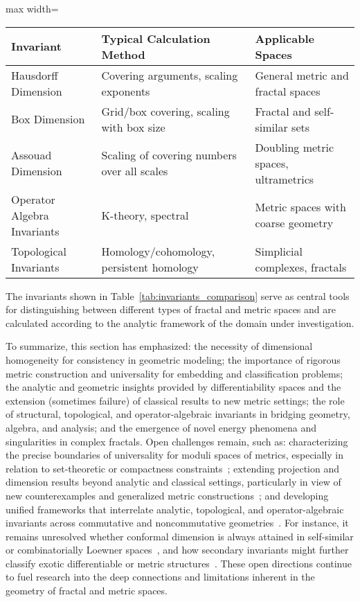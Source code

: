 \documentclass[sigconf]{acmart}
\begin{document}
\begin{table*}[htbp]
\centering
\caption{Key Invariants Across Metric Spaces and Their Calculation Methods}
\label{tab:invariants_comparison}
\begin{adjustbox}{max width=\textwidth}
\begin{tabular}{lll}
\toprule
\textbf{Invariant} & \textbf{Typical Calculation Method} & \textbf{Applicable Spaces} \\
\midrule
Hausdorff Dimension & Covering arguments, scaling exponents & General metric and fractal spaces \\
Box Dimension & Grid/box covering, scaling with box size & Fractal and self-similar sets \\
Assouad Dimension & Scaling of covering numbers over all scales & Doubling metric spaces, ultrametrics \\
Operator Algebra Invariants & K-theory, spectral & Metric spaces with coarse geometry \\
Topological Invariants & Homology/cohomology, persistent homology & Simplicial complexes, fractals \\
\bottomrule
\end{tabular}
\end{adjustbox}
\end{table*}

The invariants shown in Table~\ref{tab:invariants_comparison} serve as central tools for distinguishing between different types of fractal and metric spaces and are calculated according to the analytic framework of the domain under investigation.

To summarize, this section has emphasized: the necessity of dimensional homogeneity for consistency in geometric modeling; the importance of rigorous metric construction and universality for embedding and classification problems; the analytic and geometric insights provided by differentiability spaces and the extension (sometimes failure) of classical results to new metric settings; the role of structural, topological, and operator-algebraic invariants in bridging geometry, algebra, and analysis; and the emergence of novel energy phenomena and singularities in complex fractals. Open challenges remain, such as: characterizing the precise boundaries of universality for moduli spaces of metrics, especially in relation to set-theoretic or compactness constraints~\cite{ref50,ref51}; extending projection and dimension results beyond analytic and classical settings, particularly in view of new counterexamples and generalized metric constructions~\cite{ref11,ref43}; and developing unified frameworks that interrelate analytic, topological, and operator-algebraic invariants across commutative and noncommutative geometries~\cite{ref52,ref14,ref82}. For instance, it remains unresolved whether conformal dimension is always attained in self-similar or combinatorially Loewner spaces~\cite{ref11}, and how secondary invariants might further classify exotic differentiable or metric structures~\cite{ref14,ref82}. These open directions continue to fuel research into the deep connections and limitations inherent in the geometry of fractal and metric spaces.
\end{document}
